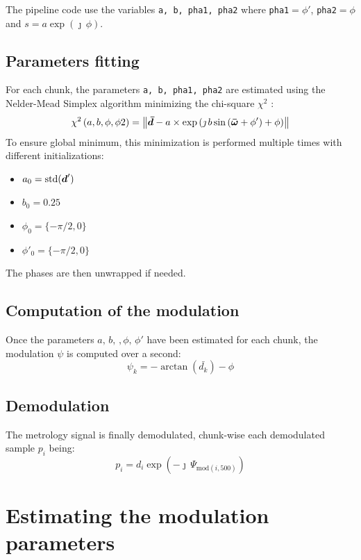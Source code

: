 \documentclass[a4paper,11pt,twoside]{scrartcl}
\begin{document}
The pipeline code use the variables \verb+a, b, pha1, pha2+ where \verb|pha1|$=\phi'$, \verb|pha2|$=\phi$ and $s = a \exp(\jmath\,\phi)$.


\subsection{Parameters fitting}
For each chunk, the parameters \verb+a, b, pha1, pha2+ are estimated using the Nelder-Mead Simplex algorithm minimizing the chi-square $\chi^2$ :
\begin{equation}
    \chi^2 \left( a, b, \phi, \phi2 \right) =   \left\Vert \boldsymbol{\bar{d}} -  a \times  \exp\left( \jmath \, b \sin\left( \boldsymbol{\bar{\omega}} + \phi' \right) + \phi \right)\right\Vert
\end{equation}
To ensure global minimum, this minimization is performed multiple times with different initializations:
\begin{itemize}
    \item $a_0 = \mathrm{std}(\boldsymbol{d}')$
    \item $b_0 = 0.25$
    \item $\phi_0 = \{-\pi/2, 0\} $
    \item $\phi'_0 = \{-\pi/2, 0\} $
\end{itemize}
The phases are then unwrapped if needed.

\subsection{Computation of the modulation}
Once the parameters $a,\,b,\,,\phi,\,\phi'$ have been estimated for each chunk, the modulation $\psi$ is computed over a second:
\begin{equation}
   \psi_k =  -\arctan(\bar{d_k}) - \phi
\end{equation}

\subsection{Demodulation}
The metrology signal is finally demodulated, chunk-wise each demodulated sample $p_i$  being:
\begin{equation}
   p_i = d_i  \exp\left(- \jmath \,\Psi_{\textrm{mod}(i,500)} \right) 
\end{equation}


\section{ Estimating the modulation parameters}
\end{document}
